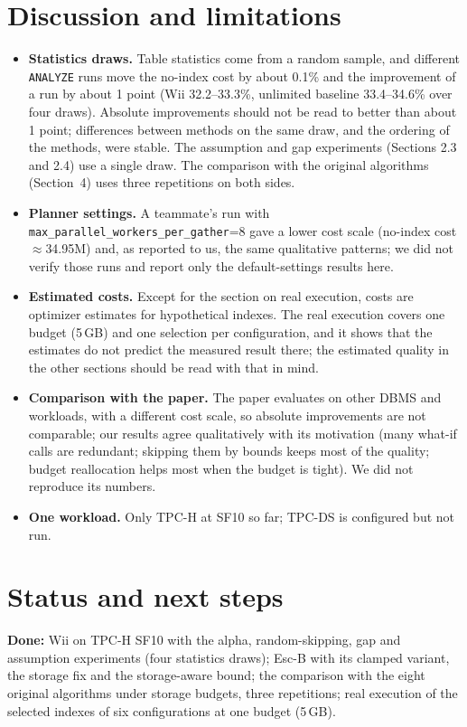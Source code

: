 \documentclass[11pt,a4paper]{article}
\begin{document}
\section{Discussion and limitations}
\begin{itemize}
\item \textbf{Statistics draws.} Table statistics come from a random sample, and different \texttt{ANALYZE} runs move the no-index cost by about 0.1\% and the improvement of a run by about 1 point (Wii 32.2--33.3\%, unlimited baseline 33.4--34.6\% over four draws). Absolute improvements should not be read to better than about 1 point; differences between methods on the same draw, and the ordering of the methods, were stable. The assumption and gap experiments (Sections 2.3 and 2.4) use a single draw. The comparison with the original algorithms (Section~4) uses three repetitions on both sides.
\item \textbf{Planner settings.} A teammate's run with \texttt{max\_parallel\_workers\_per\_gather}=8 gave a lower cost scale (no-index cost $\approx$34.95M) and, as reported to us, the same qualitative patterns; we did not verify those runs and report only the default-settings results here.
\item \textbf{Estimated costs.} Except for the section on real execution, costs are optimizer estimates for hypothetical indexes. The real execution covers one budget (5\,GB) and one selection per configuration, and it shows that the estimates do not predict the measured result there; the estimated quality in the other sections should be read with that in mind.
\item \textbf{Comparison with the paper.} The paper evaluates on other DBMS and workloads, with a different cost scale, so absolute improvements are not comparable; our results agree qualitatively with its motivation (many what-if calls are redundant; skipping them by bounds keeps most of the quality; budget reallocation helps most when the budget is tight). We did not reproduce its numbers.
\item \textbf{One workload.} Only TPC-H at SF10 so far; TPC-DS is configured but not run.
\end{itemize}

\section{Status and next steps}
\textbf{Done:} Wii on TPC-H SF10 with the alpha, random-skipping, gap and assumption experiments (four statistics draws); Esc-B with its clamped variant, the storage fix and the storage-aware bound; the comparison with the eight original algorithms under storage budgets, three repetitions; real execution of the selected indexes of six configurations at one budget (5\,GB).
\end{document}
